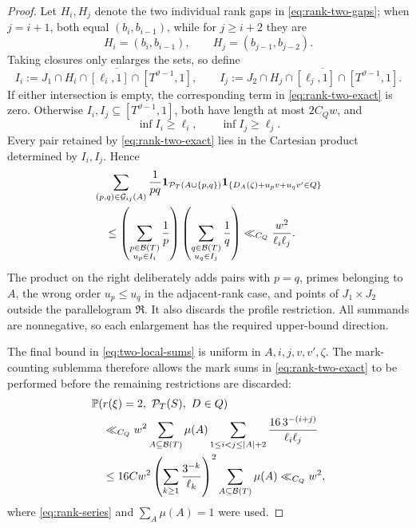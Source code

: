 \documentclass[11pt]{article}
\numberwithin{equation}{section}
\theoremstyle{plain}
\newcommand{\Pp}{\mathbb P}
\newcommand{\1}{\mathbf 1}
\newcommand{\cB}{\mathcal B}
\begin{document}
\begin{proof}
Let $H_i,H_j$ denote the two individual rank gaps in
\eqref{eq:rank-two-gaps}; when $j=i+1$, both equal
$(b_i,b_{i-1})$, while for $j\ge i+2$ they are
\[
 H_i=(b_i,b_{i-1}),\qquad H_j=(b_{j-1},b_{j-2}).
\]
Taking closures only enlarges the sets, so define
\[
 I_i:=\overline{
 J_1\cap H_i\cap[\ell_i,1]\cap[T^{\vartheta-1},1]},
 \qquad
 I_j:=\overline{
 J_2\cap H_j\cap[\ell_j,1]\cap[T^{\vartheta-1},1]}.
\]
If either intersection is empty, the corresponding term in
\eqref{eq:rank-two-exact} is zero.  Otherwise
$I_i,I_j\subseteq[T^{\vartheta-1},1]$, both have length at most $2C_Qw$,
and
\[
 \inf I_i\ge\ell_i,\qquad \inf I_j\ge\ell_j.
\]
Every pair retained by \eqref{eq:rank-two-exact} lies in the Cartesian
product determined by $I_i,I_j$.  Hence
\begin{align}
 &\sum_{(p,q)\in\mathcal G_{ij}(A)}\frac1{pq}
   \1_{\mathcal P_T(A\cup\{p,q\})}
   \1_{\{D_A(\zeta)+u_pv+u_qv'\in Q\}}\notag\\
 &\quad\le
 \left(\sum_{\substack{p\in\cB(T)\\u_p\in I_i}}\frac1p\right)
 \left(\sum_{\substack{q\in\cB(T)\\u_q\in I_j}}\frac1q\right)
 \ll_{C_Q}\frac{w^2}{\ell_i\ell_j}.
                                                        \label{eq:two-local-sums}
\end{align}
The product on the right deliberately adds pairs with $p=q$, primes
belonging to $A$, the wrong order $u_p\le u_q$ in the adjacent-rank case,
and points of $J_1\times J_2$ outside the parallelogram $\mathfrak R$.  It
also discards the profile restriction.  All summands are nonnegative, so
each enlargement has the required upper-bound direction.

The final bound in \eqref{eq:two-local-sums} is uniform in
$A,i,j,v,v',\zeta$.  The mark-counting sublemma therefore allows the mark
sums in \eqref{eq:rank-two-exact} to be performed before the remaining
restrictions are discarded:
\begin{align}
 &\Pp(r(\xi)=2,\ \mathcal P_T(S),\ D\in Q)\notag\\
 &\quad\ll_{C_Q}w^2
 \sum_{A\subseteq\cB(T)}\mu(A)
 \sum_{1\le i<j\le |A|+2}
 \frac{16\,3^{-(i+j)}}{\ell_i\ell_j}\notag\\
 &\quad\le
 16Cw^2
 \left(\sum_{k\ge1}\frac{3^{-k}}{\ell_k}\right)^2
 \sum_{A\subseteq\cB(T)}\mu(A)
 \ll_{C_Q}w^2,                                      \label{eq:rank-two-bound}
\end{align}
where \eqref{eq:rank-series} and $\sum_A\mu(A)=1$ were used.


\end{proof}
\end{document}
